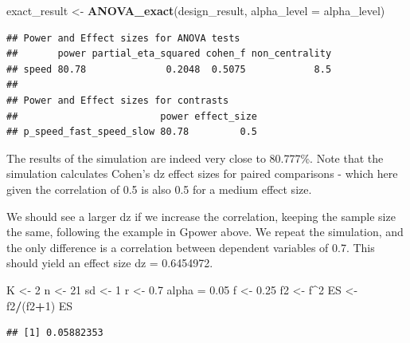 \documentclass[]{book}
\newenvironment{Shaded}{\begin{snugshade}}{\end{snugshade}}
\newcommand{\DataTypeTok}[1]{\textcolor[rgb]{0.13,0.29,0.53}{#1}}
\newcommand{\DecValTok}[1]{\textcolor[rgb]{0.00,0.00,0.81}{#1}}
\newcommand{\FloatTok}[1]{\textcolor[rgb]{0.00,0.00,0.81}{#1}}
\newcommand{\KeywordTok}[1]{\textcolor[rgb]{0.13,0.29,0.53}{\textbf{#1}}}
\newcommand{\NormalTok}[1]{#1}
\newcommand{\OperatorTok}[1]{\textcolor[rgb]{0.81,0.36,0.00}{\textbf{#1}}}
\newcommand{\StringTok}[1]{\textcolor[rgb]{0.31,0.60,0.02}{#1}}
\begin{document}
\begin{Shaded}
\begin{Highlighting}[]
\NormalTok{exact_result <-}\StringTok{ }\KeywordTok{ANOVA_exact}\NormalTok{(design_result, }\DataTypeTok{alpha_level =}\NormalTok{ alpha_level)}
\end{Highlighting}
\end{Shaded}

\begin{verbatim}
## Power and Effect sizes for ANOVA tests
##       power partial_eta_squared cohen_f non_centrality
## speed 80.78              0.2048  0.5075            8.5
## 
## Power and Effect sizes for contrasts
##                         power effect_size
## p_speed_fast_speed_slow 80.78         0.5
\end{verbatim}

The results of the simulation are indeed very close to 80.777\%. Note that the simulation calculates Cohen's dz effect sizes for paired comparisons - which here given the correlation of 0.5 is also 0.5 for a medium effect size.

We should see a larger dz if we increase the correlation, keeping the sample size the same, following the example in Gpower above. We repeat the simulation, and the only difference is a correlation between dependent variables of 0.7. This should yield an effect size dz = 0.6454972.

\begin{Shaded}
\begin{Highlighting}[]
\NormalTok{K <-}\StringTok{ }\DecValTok{2}
\NormalTok{n <-}\StringTok{ }\DecValTok{21}
\NormalTok{sd <-}\StringTok{ }\DecValTok{1}
\NormalTok{r <-}\StringTok{ }\FloatTok{0.7}
\NormalTok{alpha =}\StringTok{ }\FloatTok{0.05}
\NormalTok{f <-}\StringTok{ }\FloatTok{0.25}
\NormalTok{f2 <-}\StringTok{ }\NormalTok{f}\OperatorTok{^}\DecValTok{2}
\NormalTok{ES <-}\StringTok{ }\NormalTok{f2}\OperatorTok{/}\NormalTok{(f2}\OperatorTok{+}\DecValTok{1}\NormalTok{)}
\NormalTok{ES}
\end{Highlighting}
\end{Shaded}

\begin{verbatim}
## [1] 0.05882353
\end{verbatim}
\end{document}
